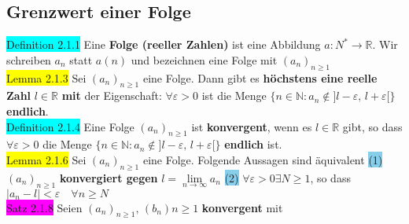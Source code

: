 \documentclass[landscape, 10pt]{article}
\newcommand{\R}{\mathbb{R}}
\newcommand{\N}{\mathbb{N}}
\begin{document}
\begin{multicols}{3}
       \subsection{Grenzwert einer Folge}
              \colorbox{cyan}{Definition 2.1.1} 
                     Eine \textbf{Folge (reeller Zahlen)} ist 
                     eine Abbildung $a:N^{*}\longrightarrow\R$. 
                     Wir schreiben $a_n$ statt $a(n)$ und 
                     bezeichnen eine Folge mit 
                     \textcolor{NavyBlue}{$(a_n)_{n\geqslant 1}$}\\
              \colorbox{yellow}{Lemma 2.1.3} 
                     Sei $(a_n)_{n\geqslant 1}$ eine 
                     Folge. Dann gibt es \textbf{höchstens eine reelle Zahl} 
                     \textcolor{NavyBlue}{$l\in\R$} 
                     \textbf{mit} der Eigenschaft: 
                     \textcolor{NavyBlue}{$\forall\varepsilon >0$} ist die Menge 
                     \textcolor{NavyBlue}{
                     $\{n\in\N:a_n\notin ]l-\varepsilon,\,l+\varepsilon[\}$} 
                     \textbf{endlich}.\\
              \colorbox{cyan}{Definition 2.1.4} 
                     Eine Folge $(a_n)_{n\geqslant 1}$ ist 
                     \textbf{konvergent}, wenn es \textcolor{NavyBlue}{$l\in\R$} 
                     gibt, so dass 
                     \textcolor{NavyBlue}{$\forall\varepsilon >0$} die Menge 
                     \textcolor{NavyBlue}{
                     $\{n\in\N:a_n\notin ]l-\varepsilon,\, l+\varepsilon[\}$} 
                     \textbf{endlich} ist.\\
              \colorbox{yellow}{Lemma 2.1.6} 
                     Sei $(a_n)_{n\geqslant 1}$ eine Folge. 
                     Folgende Aussagen sind äquivalent
                     \colorbox{SkyBlue}{(1)} 
                     \textcolor{NavyBlue}{$(a_n)_{n\geqslant 1}$} 
                     \textbf{konvergiert gegen} 
                     \textcolor{NavyBlue}{$l=\lim\limits_{n\to\infty}a_n$}
                     \quad\colorbox{SkyBlue}{(2)} 
                     \textcolor{NavyBlue}{
                     $\forall\varepsilon >0\exists N\geqslant 1$}, 
                     so dass \textcolor{
                     NavyBlue}{$|a_n-l|<\varepsilon \quad\forall n\geqslant N$}\\
              \colorbox{magenta}{Satz 2.1.8} 
                     Seien \textcolor{NavyBlue}{
                     $(a_n)_{n\geqslant 1},\,(b_n){n\geqslant 1}$} 
                     \textbf{konvergent} mit 

\end{multicols}
\end{document}
